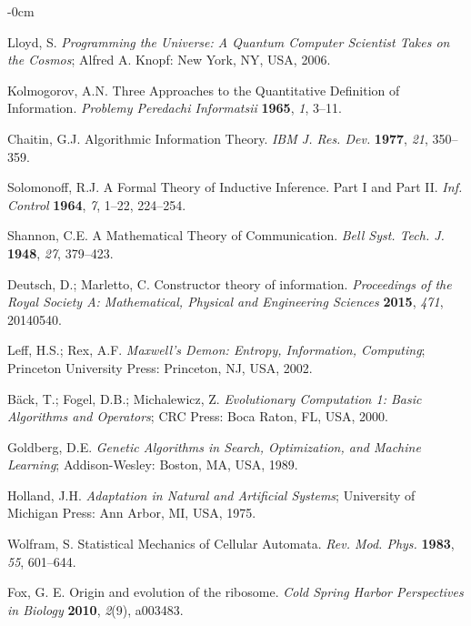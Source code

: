 \documentclass[entropy,article,submit,pdftex,moreauthors]{Definitions/mdpi}
\begin{document}
\begin{adjustwidth}{-\extralength}{0cm}
\begin{thebibliography}{999}
Lloyd, S. \textit{Programming the Universe: A Quantum Computer Scientist Takes on the Cosmos}; Alfred A. Knopf: New York, NY, USA, 2006.

Kolmogorov, A.N. Three Approaches to the Quantitative Definition of Information. \textit{Problemy Peredachi Informatsii} \textbf{1965}, \textit{1}, 3–11.

Chaitin, G.J. Algorithmic Information Theory. \textit{IBM J. Res. Dev.} \textbf{1977}, \textit{21}, 350–359. 

Solomonoff, R.J. A Formal Theory of Inductive Inference. Part I and Part II. \textit{Inf. Control} \textbf{1964}, \textit{7}, 1–22, 224–254.

Shannon, C.E. A Mathematical Theory of Communication. \textit{Bell Syst. Tech. J.} \textbf{1948}, \textit{27}, 379–423.

Deutsch, D.; Marletto, C. Constructor theory of information. \textit{Proceedings of the Royal Society A: Mathematical, Physical and Engineering Sciences} \textbf{2015}, \textit{471}, 20140540. 

Leff, H.S.; Rex, A.F. \textit{Maxwell’s Demon: Entropy, Information, Computing}; Princeton University Press: Princeton, NJ, USA, 2002.

Bäck, T.; Fogel, D.B.; Michalewicz, Z. \textit{Evolutionary Computation 1: Basic Algorithms and Operators}; CRC Press: Boca Raton, FL, USA, 2000.

Goldberg, D.E. \textit{Genetic Algorithms in Search, Optimization, and Machine Learning}; Addison-Wesley: Boston, MA, USA, 1989.

Holland, J.H. \textit{Adaptation in Natural and Artificial Systems}; University of Michigan Press: Ann Arbor, MI, USA, 1975.

Wolfram, S. Statistical Mechanics of Cellular Automata. \textit{Rev. Mod. Phys.} \textbf{1983}, \textit{55}, 601–644.

Fox, G. E. 
Origin and evolution of the ribosome. 
\textit{Cold Spring Harbor Perspectives in Biology} \textbf{2010}, \textit{2}(9), a003483.


\end{thebibliography}
\end{adjustwidth}
\end{document}

